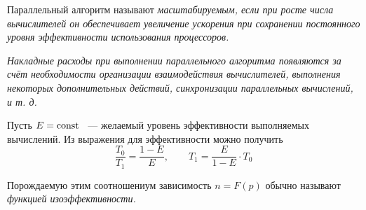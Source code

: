 \begin{definition}
	Параллельный алгоритм называют \it{масштабируемым}, если при росте числа вычислителей он обеспечивает увеличение ускорения при сохранении постоянного уровня эффективности использования процессоров.
\end{definition}

\begin{definition}
	\it{Накладные расходы} при выполнении параллельного алгоритма появляются за счёт необходимости организации взаимодействия вычислителей, выполнения некоторых дополнительных действий, синхронизации параллельных вычислений, и т. д.
\end{definition}

Пусть $ E = \operatorname{const} $ ~--- желаемый уровень эффективности выполняемых вычислений. Из выражения для эффективности можно получить
$$ \frac{T_0}{T_1} = \frac{1 - E}E, \qquad T_1 = \frac E{1 - E} \cdot T_0 $$

Порождаемую этим соотношениум зависимость $ n = F(p) $ обычно называют \it{функцией изоэффективности}.

